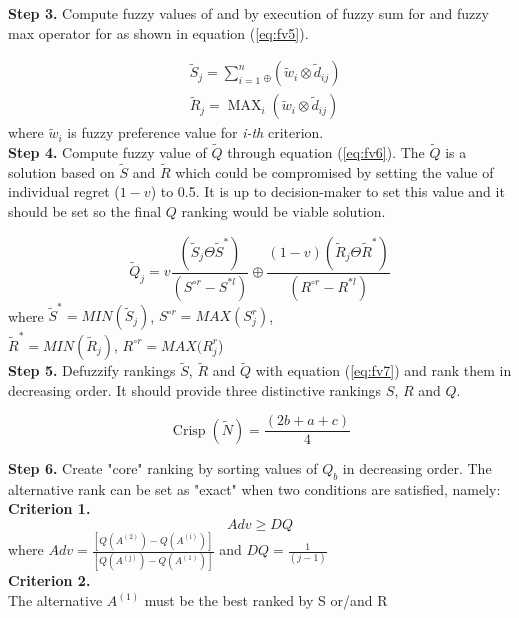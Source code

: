 \noindent \textbf{Step 3.} Compute fuzzy values of  and  by execution of fuzzy sum for  and fuzzy max operator for  as shown in equation (\ref{eq:fv5}).

\begin{equation}
\begin{aligned}
&\tilde{S}_{j}=\sum_{i=1}^{n}{ }_{\oplus}\left(\tilde{w}_{i} \otimes \tilde{d}_{i j}\right) \\
&\tilde{R}_{j}=\operatorname{MAX}_{i}\left(\tilde{w}_{i} \otimes \tilde{d}_{i j}\right)
\end{aligned}
\label{eq:fv5}
\end{equation}
where $\tilde{w}_{i}$ is fuzzy preference value for \textit{i-th} criterion.\\


\noindent \textbf{Step 4.} Compute fuzzy value of $\tilde{Q}$ through equation (\ref{eq:fv6}). The $\tilde{Q}$ is a solution based on $\tilde{S}$ and $\tilde{R}$ which could be compromised by setting the value of individual regret ($1-v$) to 0.5. It is up to decision-maker to set this value and it should be set so the final $\textit{Q}$ ranking would be viable solution.

\begin{equation}
    \tilde{Q}_{j}=v\frac{\left(\tilde{S}_{j} \Theta \tilde{S}^{*}\right)}{\left(S^{\circ r}-S^{* l}\right)} \oplus \frac{(1-v)\left(\tilde{R}_{j} \Theta \tilde{R}^{*}\right)}{\left(R^{\circ r}-R^{* l}\right)}
    \label{eq:fv6}
\end{equation}
where $\tilde{S}^{*}=MIN(\tilde{S}_{j})$, $S^{\circ r}=MAX(S_{j}^{r})$,\\ $\tilde{R}^{*}=MIN(\tilde{R}_{j})$, $R^{\circ r}=MAX(R_{j}^{r}$)\\

\noindent \textbf{Step 5.} Defuzzify rankings $\tilde{S}$, $\tilde{R}$ and $\tilde{Q}$ with equation (\ref{eq:fv7}) and rank them in decreasing order. It should provide three distinctive rankings $S$, $R$ and $Q$.

\begin{equation}
\operatorname{Crisp}(\tilde{N})=\frac{(2 b+a+c)}{4}
\label{eq:fv7}
\end{equation}

\noindent \textbf{Step 6.} Create "core" ranking by sorting values of $Q_{b}$ in decreasing order. The alternative rank can be set as "exact" when two conditions are satisfied, namely:\\
\textbf{Criterion 1.}\\
\begin{equation}
Adv \geq DQ
\end{equation}
where $Adv=\frac{\left[Q\left(A^{(2)}\right)-Q\left(A^{(\mathrm{i})}\right)\right]} {\left[Q\left(A^{(\mathrm{j})}\right)-Q\left(A^{(1)}\right)\right]}$
and $DQ = \frac{1}{(j-1)}$\\
\textbf{Criterion 2.}\\
The alternative $A^{(1)}$ must be the best ranked by S or/and R
\\

